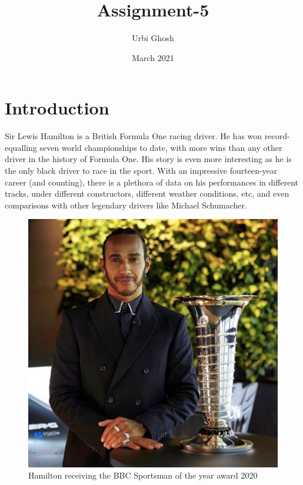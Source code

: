 \documentclass{article}
\title{Assignment-5}
\author{Urbi Ghosh}
\date{March 2021}
\begin{document}
\maketitle

\section{Introduction}
Sir Lewis Hamilton is a British Formula One racing driver. He has won record-equalling seven world championships to date, with more wins than any other driver in the history of Formula One. His story is even more interesting as he is the only black driver to race in the sport.  With an impressive fourteen-year career (and counting), there is a plethora of data on his performances in different tracks, under different constructors, different weather conditions, etc, and even comparisons with other legendary drivers like Michael Schumacher.
\begin{figure}[h]
\centering
\includegraphics[scale=0.3]{lh}
\caption{Hamilton receiving the BBC Sportsman of the year award 2020}
\label{fig:lh}
\end{figure}
\\
\end{document}
